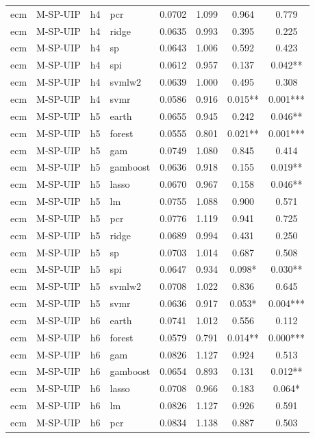 \begin{ThreePartTable}
\begin{longtable}[t]{llclcccc}
ecm & M-SP-UIP & h4 & pcr & 0.0702 & 1.099 & 0.964 & 0.779\\
ecm & M-SP-UIP & h4 & ridge & 0.0635 & 0.993 & 0.395 & 0.225\\
ecm & M-SP-UIP & h4 & sp & 0.0643 & 1.006 & 0.592 & 0.423\\
ecm & M-SP-UIP & h4 & spi & 0.0612 & 0.957 & 0.137 & 0.042**\\
ecm & M-SP-UIP & h4 & svmlw2 & 0.0639 & 1.000 & 0.495 & 0.308\\
ecm & M-SP-UIP & h4 & svmr & 0.0586 & 0.916 & 0.015** & 0.001***\\
\addlinespace
ecm & M-SP-UIP & h5 & earth & 0.0655 & 0.945 & 0.242 & 0.046**\\
ecm & M-SP-UIP & h5 & forest & 0.0555 & 0.801 & 0.021** & 0.001***\\
ecm & M-SP-UIP & h5 & gam & 0.0749 & 1.080 & 0.845 & 0.414\\
ecm & M-SP-UIP & h5 & gamboost & 0.0636 & 0.918 & 0.155 & 0.019**\\
ecm & M-SP-UIP & h5 & lasso & 0.0670 & 0.967 & 0.158 & 0.046**\\
ecm & M-SP-UIP & h5 & lm & 0.0755 & 1.088 & 0.900 & 0.571\\
ecm & M-SP-UIP & h5 & pcr & 0.0776 & 1.119 & 0.941 & 0.725\\
ecm & M-SP-UIP & h5 & ridge & 0.0689 & 0.994 & 0.431 & 0.250\\
ecm & M-SP-UIP & h5 & sp & 0.0703 & 1.014 & 0.687 & 0.508\\
ecm & M-SP-UIP & h5 & spi & 0.0647 & 0.934 & 0.098* & 0.030**\\
ecm & M-SP-UIP & h5 & svmlw2 & 0.0708 & 1.022 & 0.836 & 0.645\\
ecm & M-SP-UIP & h5 & svmr & 0.0636 & 0.917 & 0.053* & 0.004***\\
\addlinespace
ecm & M-SP-UIP & h6 & earth & 0.0741 & 1.012 & 0.556 & 0.112\\
ecm & M-SP-UIP & h6 & forest & 0.0579 & 0.791 & 0.014** & 0.000***\\
ecm & M-SP-UIP & h6 & gam & 0.0826 & 1.127 & 0.924 & 0.513\\
ecm & M-SP-UIP & h6 & gamboost & 0.0654 & 0.893 & 0.131 & 0.012**\\
ecm & M-SP-UIP & h6 & lasso & 0.0708 & 0.966 & 0.183 & 0.064*\\
ecm & M-SP-UIP & h6 & lm & 0.0826 & 1.127 & 0.926 & 0.591\\
ecm & M-SP-UIP & h6 & pcr & 0.0834 & 1.138 & 0.887 & 0.503\\

\end{longtable}
\end{ThreePartTable}

